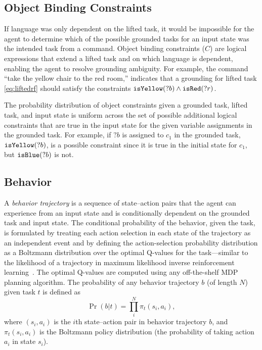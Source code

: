 \documentclass[conference]{IEEEtran}
\begin{document}
\subsection{Object Binding Constraints}
If language was only dependent on the lifted task, it would be impossible for the agent to determine which of the possible grounded tasks for an input state was the intended task from a command.
Object binding constraints ($C$) are logical expressions that extend a lifted task and on which language is dependent, enabling the agent to resolve grounding ambiguity. 
For example, the command ``take the yellow chair to the red room,'' indicates that a grounding for lifted task \ref{eq:liftedrf} should satisfy the constraints ${\tt isYellow}(?b) \land {\tt isRed}(?r)$.

The probability distribution of object constraints given a grounded task, lifted task, and input state is uniform across the set of possible additional logical constraints that are true in the input state for the given variable assignments in the grounded task. For example, if $?b$ is assigned to $c_1$ in the grounded task, ${\tt isYellow}(?b)$, is a possible constraint since it is true in the initial state for $c_1$, but ${\tt isBlue}(?b)$ is not.

\subsection{Behavior}
A \emph{behavior trajectory} is a sequence of state--action pairs that the agent can experience from an input state and is conditionally dependent on the grounded task and input state. The conditional probability of the behavior, given the task, is formulated by treating each action selection in each state of the trajectory as an independent event and by defining the action-selection probability distribution as a Boltzmann distribution over the optimal Q-values for the task---similar to the likelihood of a trajectory in maximum likelihood inverse reinforcement learning~\cite{babes11}. The optimal Q-values are computed using any off-the-shelf MDP planning algorithm. The probability of any behavior trajectory $b$ (of length $N$) given task $t$ is defined as 
\begin{equation}
\label{eq:trajProb}
\Pr(b | t) = \prod^N_i \pi_t(s_i, a_i), 
\end{equation}
where $(s_i, a_i)$ is the $i$th state--action pair in behavior trajectory $b$, and $\pi_t(s_i, a_i)$ is the Boltzmann policy distribution (the probability of taking action $a_i$ in state $s_i$). 
\end{document}
